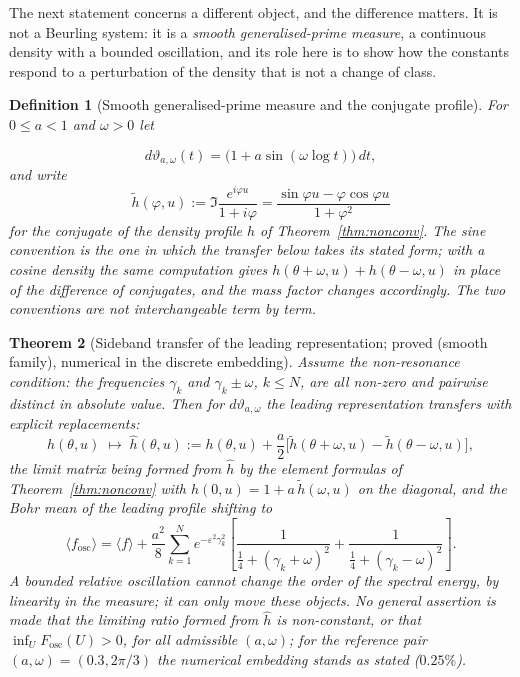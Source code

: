 \documentclass[11pt]{article}
\newtheorem{theorem}{Theorem}[section]
\newtheorem{definition}[theorem]{Definition}
\begin{document}
The next statement concerns a different object, and the difference matters.
It is not a Beurling system: it is a \emph{smooth generalised-prime measure},
a continuous density with a bounded oscillation, and its role here is to show
how the constants respond to a perturbation of the density that is not a
change of class.

\begin{definition}[Smooth generalised-prime measure and the conjugate profile]
\label{def:smoothosc}
For $0\le a<1$ and $\omega>0$ let

\[
d\vartheta_{a,\omega}(t)=\bigl(1+a\sin(\omega\log t)\bigr)\,dt,
\]
 and write
\[
\tilde h(\varphi,u):=\Im\frac{e^{i\varphi u}}{1+i\varphi}
=\frac{\sin\varphi u-\varphi\cos\varphi u}{1+\varphi^{2}}
\]
for the conjugate of the density profile $h$ of
Theorem~\ref{thm:nonconv}. The sine convention is the one in which the
transfer below takes its stated form; with a cosine density the same
computation gives $h(\theta+\omega,u)+h(\theta-\omega,u)$ in place of the
difference of conjugates, and the mass factor changes accordingly. The two
conventions are not interchangeable term by term.
\end{definition}

\begin{theorem}[Sideband transfer of the leading representation; proved
(smooth family), numerical in the discrete embedding]
\label{thm:sideband}
Assume the non-resonance condition: the frequencies $\gamma_k$ and
$\gamma_k\pm\omega$, $k\le N$, are all non-zero and pairwise distinct in
absolute value. Then for $d\vartheta_{a,\omega}$ the leading representation transfers
with explicit replacements:
\[
h(\theta,u)\;\longmapsto\;\hat h(\theta,u)
:=h(\theta,u)+\frac{a}{2}\bigl[\tilde h(\theta+\omega,u)
-\tilde h(\theta-\omega,u)\bigr],
\]
the limit matrix being formed from $\hat h$ by the element formulas of
Theorem~\ref{thm:nonconv} with $\hat h(0,u)=1+a\,\tilde h(\omega,u)$ on the
diagonal, and the Bohr mean of the leading profile shifting to
\[
\langle f_{\mathrm{osc}}\rangle=\langle f\rangle+\frac{a^2}{8}
\sum_{k=1}^{N}e^{-\varepsilon^2\gamma_k^2}
\left[\frac{1}{\tfrac14+(\gamma_k+\omega)^2}
     +\frac{1}{\tfrac14+(\gamma_k-\omega)^2}\right].
\]
A bounded relative oscillation cannot change the \emph{order} of the spectral
energy, by linearity in the measure; it can only move these objects.
No general assertion is made that the limiting ratio formed from $\hat h$ is
non-constant, or that $\inf_U F_{\mathrm{osc}}(U)>0$, for all admissible
$(a,\omega)$; for the reference pair $(a,\omega)=(0.3,2\pi/3)$ the
numerical embedding stands as stated ($0.25\%$).
\end{theorem}
\end{document}
